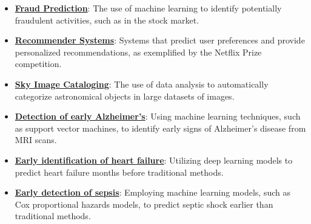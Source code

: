 \documentclass{article}%
\begin{document}
\begin{itemize}[leftmargin=*]
\item \href{https://purdue.brightspace.com/d2l/common/assets/pdfjs-d2l-dist/1.0.14-legacy/web/viewer.html?file=\%2Fcontent\%2Fenforced\%2F1095465-WL.202510.CS24200.LE1\%2F02L1-datas-intro.pdf\%3Fou\%3D1095465\&lang=en-us\&container=d2l-fileviewer-rendered-pdf\&fullscreen=d2l-fileviewer-rendered-pdf-dialog\&height=667#page=13}{\textbf{Fraud Prediction}}: The use of machine learning to identify potentially fraudulent activities, such as in the stock market.%
\item \href{https://purdue.brightspace.com/d2l/common/assets/pdfjs-d2l-dist/1.0.14-legacy/web/viewer.html?file=\%2Fcontent\%2Fenforced\%2F1095465-WL.202510.CS24200.LE1\%2F02L1-datas-intro.pdf\%3Fou\%3D1095465\&lang=en-us\&container=d2l-fileviewer-rendered-pdf\&fullscreen=d2l-fileviewer-rendered-pdf-dialog\&height=667#page=14}{\textbf{Recommender Systems}}: Systems that predict user preferences and provide personalized recommendations, as exemplified by the Netflix Prize competition.%
\item \href{https://purdue.brightspace.com/d2l/common/assets/pdfjs-d2l-dist/1.0.14-legacy/web/viewer.html?file=\%2Fcontent\%2Fenforced\%2F1095465-WL.202510.CS24200.LE1\%2F02L1-datas-intro.pdf\%3Fou\%3D1095465\&lang=en-us\&container=d2l-fileviewer-rendered-pdf\&fullscreen=d2l-fileviewer-rendered-pdf-dialog\&height=667#page=15}{\textbf{Sky Image Cataloging}}: The use of data analysis to automatically categorize astronomical objects in large datasets of images.%
\item \href{https://purdue.brightspace.com/d2l/common/assets/pdfjs-d2l-dist/1.0.14-legacy/web/viewer.html?file=\%2Fcontent\%2Fenforced\%2F1095465-WL.202510.CS24200.LE1\%2F02L1-datas-intro.pdf\%3Fou\%3D1095465\&lang=en-us\&container=d2l-fileviewer-rendered-pdf\&fullscreen=d2l-fileviewer-rendered-pdf-dialog\&height=667#page=16}{\textbf{Detection of early Alzheimer's}}: Using machine learning techniques, such as support vector machines, to identify early signs of Alzheimer's disease from MRI scans.%
\item \href{https://purdue.brightspace.com/d2l/common/assets/pdfjs-d2l-dist/1.0.14-legacy/web/viewer.html?file=\%2Fcontent\%2Fenforced\%2F1095465-WL.202510.CS24200.LE1\%2F02L1-datas-intro.pdf\%3Fou\%3D1095465\&lang=en-us\&container=d2l-fileviewer-rendered-pdf\&fullscreen=d2l-fileviewer-rendered-pdf-dialog\&height=667#page=17}{\textbf{Early identification of heart failure}}: Utilizing deep learning models to predict heart failure months before traditional methods.%
\item \href{https://purdue.brightspace.com/d2l/common/assets/pdfjs-d2l-dist/1.0.14-legacy/web/viewer.html?file=\%2Fcontent\%2Fenforced\%2F1095465-WL.202510.CS24200.LE1\%2F02L1-datas-intro.pdf\%3Fou\%3D1095465\&lang=en-us\&container=d2l-fileviewer-rendered-pdf\&fullscreen=d2l-fileviewer-rendered-pdf-dialog\&height=667#page=19}{\textbf{Early detection of sepsis}}: Employing machine learning models, such as Cox proportional hazards models, to predict septic shock earlier than traditional methods.%

\end{itemize}
\end{document}
